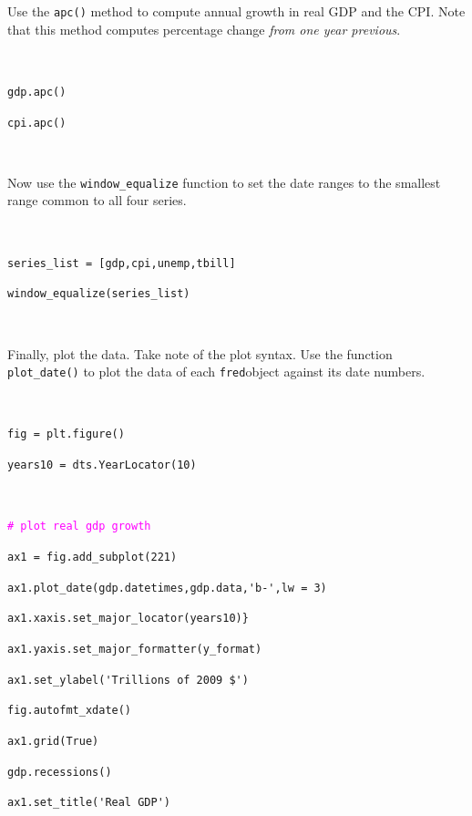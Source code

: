 \documentclass[11pt,fleqn]{article}
\newcommand{\ttt}{\texttt}
\newcommand{\tc}{\textcolor}
\begin{document}
\noindent Use the \ttt{apc()} method to compute annual growth in real GDP and the CPI. Note that this method computes percentage change \emph{from one year previous}.

\

\begin{minipage}{6.5in}
\ttt{gdp.apc()}

\ttt{cpi.apc()}

\

\end{minipage}

\noindent Now use the \ttt{window\_equalize} function to set the date ranges to the smallest range common to all four series.

\

\begin{minipage}{6.5in}
\verb!series_list = [gdp,cpi,unemp,tbill]!

\verb!window_equalize(series_list)!

\

\end{minipage}

\noindent Finally, plot the data. Take note of the plot syntax. Use the function \verb!plot_date()! to plot the data of each \ttt{fred}object against its date numbers.

\

\begin{minipage}{6.5in}
\ttt{fig = plt.figure()}

\ttt{years10  = dts.YearLocator(10)}

\
\end{minipage}


\begin{minipage}{6.5in}
\ttt{\tc{Magenta}{\# plot real gdp growth}}

\verb!ax1 = fig.add_subplot(221)!

\verb!ax1.plot_date(gdp.datetimes,gdp.data,'b-',lw = 3)!

\verb!ax1.xaxis.set_major_locator(years10)}!

\verb!ax1.yaxis.set_major_formatter(y_format)!

\verb!ax1.set_ylabel('Trillions of 2009 $')!

\verb!fig.autofmt_xdate()!

\ttt{ax1.grid(True)}

\ttt{gdp.recessions()}

\verb!ax1.set_title('Real GDP')!

\

\end{minipage}
\end{document}
